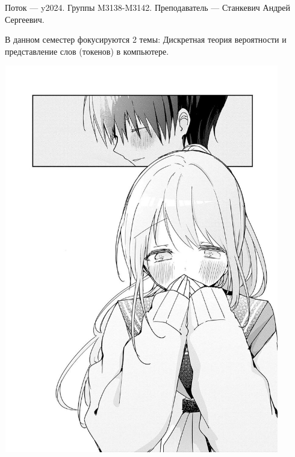 Поток — y2024.\newline
Группы M3138-M3142.\newline
Преподаватель --- Станкевич Андрей Сергеевич.\par
В данном семестер фокусируются 2 темы: Дискретная теория вероятности и представление слов (токенов) в компьютере.\newline
\begin{center}
   \includegraphics[width=12cm, height=17cm]{MyLoveImages/myLove.jpg}
\end{center}